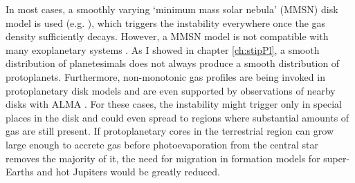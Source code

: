 In most cases, a smoothly varying `minimum mass solar nebula' (MMSN) disk model is used (e.g. \cite{kominami02, dawson15}), which triggers the instability everywhere once the gas density sufficiently decays. However, a MMSN model is not compatible with many exoplanetary systems \cite{chiang13, schlicting14}. As I showed in chapter \ref{ch:stipPl}, a smooth distribution of planetesimals does not always produce a smooth distribution of protoplanets. Furthermore, non-monotonic gas profiles are being invoked in protoplanetary disk models \cite{chatterjee14, ogihara15} and are even supported by observations of nearby disks with ALMA \cite{isella16, andrews16}. For these cases, the instability might trigger only in special places in the disk and could even spread to regions where substantial amounts of gas are still present. If protoplanetary cores in the terrestrial region can grow large enough to accrete gas before photoevaporation from the central star removes the majority of it, the need for migration in formation models for super-Earths and hot Jupiters would be greatly reduced.